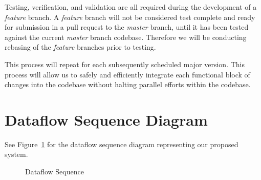 \documentclass[11pt]{scrreprt}
\begin{document}
Testing, verification, and validation are all required during the development of a \textit{feature} branch. A \textit{feature} branch will not be considered test complete and ready for submission in a pull request to the \textit{master} branch, until it has been tested against the current \textit{master} branch codebase. Therefore we will be conducting rebasing of the \textit{feature} branches prior to testing.

This process will repeat for each subsequently scheduled major version. This process will allow us to safely and efficiently integrate each functional block of changes into the codebase without halting parallel efforts within the codebase.

\section{Dataflow Sequence Diagram}
See Figure~\ref{fig:dataflow} for the dataflow sequence diagram representing our proposed system.

\begin{figure}[hp]
  \caption{Dataflow Sequence}
  \label{fig:dataflow}
\end{figure}
\end{document}
